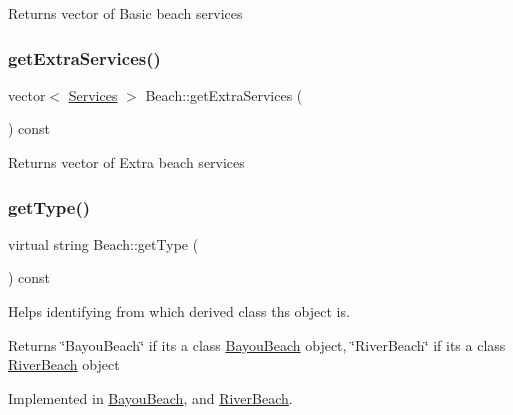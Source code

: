 \begin{DoxyReturn}{Returns}
vector of Basic beach services 
\end{DoxyReturn}
\mbox{\label{class_beach_a69ce8d1f21dc1b81edd6df001ec6c2b2}} 
\subsubsection{\texorpdfstring{get\+Extra\+Services()}{getExtraServices()}}
{\footnotesize\ttfamily vector$<$ \hyperlink{class_services}{Services} $>$ Beach\+::get\+Extra\+Services (\begin{DoxyParamCaption}{ }\end{DoxyParamCaption}) const}

\begin{DoxyReturn}{Returns}
vector of Extra beach services 
\end{DoxyReturn}
\mbox{\label{class_beach_a30001df535b2456e47611c7a0705660b}} 
\subsubsection{\texorpdfstring{get\+Type()}{getType()}}
{\footnotesize\ttfamily virtual string Beach\+::get\+Type (\begin{DoxyParamCaption}{ }\end{DoxyParamCaption}) const\hspace{0.3cm}{\ttfamily [pure virtual]}}



Helps identifying from which derived class ths object is. 

\begin{DoxyReturn}{Returns}
\char`\"{}\+Bayou\+Beach\char`\"{} if it\textquotesingle{}s a class \hyperlink{class_bayou_beach}{Bayou\+Beach} object, \char`\"{}\+River\+Beach\char`\"{} if it\textquotesingle{}s a class \hyperlink{class_river_beach}{River\+Beach} object 
\end{DoxyReturn}


Implemented in \hyperlink{class_bayou_beach_aad2b96c052075911ae3c0d23fd38b067}{Bayou\+Beach}, and \hyperlink{class_river_beach_a07f48c077de96aca001f47ce06253f2f}{River\+Beach}.

\mbox{\label{class_beach_a37e71c3348356d49f3b1080973708376}} 
